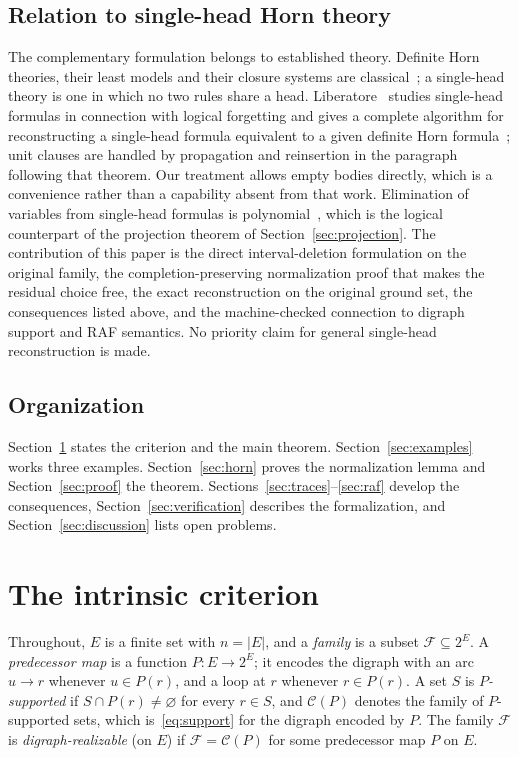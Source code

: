 \documentclass[11pt,a4paper]{article}
\theoremstyle{plain}
\theoremstyle{definition}
\theoremstyle{remark}
\newcommand{\cC}{\mathcal C}
\newcommand{\cF}{\mathcal F}
\newcommand{\pw}[1]{2^{#1}}
\begin{document}
\subsection{Relation to single-head Horn theory}

The complementary formulation belongs to established theory. Definite Horn theories, their least models and their closure systems are classical~\cite{dowling1984linear,wild2017joy}; a single-head theory is one in which no two rules share a head. Liberatore~\cite{liberatore2023reconstructing} studies single-head formulas in connection with logical forgetting and gives a complete algorithm for reconstructing a single-head formula equivalent to a given definite Horn formula~\cite[Theorem~4.1]{liberatore2023reconstructing}; unit clauses are handled by propagation and reinsertion in the paragraph following that theorem. Our treatment allows empty bodies directly, which is a convenience rather than a capability absent from that work. Elimination of variables from single-head formulas is polynomial~\cite[Section~5.7]{liberatore2020common}, which is the logical counterpart of the projection theorem of Section~\ref{sec:projection}. The contribution of this paper is the direct interval-deletion formulation on the original family, the completion-preserving normalization proof that makes the residual choice free, the exact reconstruction on the original ground set, the consequences listed above, and the machine-checked connection to digraph support and RAF semantics. No priority claim for general single-head reconstruction is made.

\subsection{Organization}

Section~\ref{sec:criterion} states the criterion and the main theorem. Section~\ref{sec:examples} works three examples. Section~\ref{sec:horn} proves the normalization lemma and Section~\ref{sec:proof} the theorem. Sections~\ref{sec:traces}--\ref{sec:raf} develop the consequences, Section~\ref{sec:verification} describes the formalization, and Section~\ref{sec:discussion} lists open problems.

\section{The intrinsic criterion}\label{sec:criterion}

Throughout, $E$ is a finite set with $n=|E|$, and a \emph{family} is a subset $\cF\subseteq\pw{E}$. A \emph{predecessor map} is a function $P:E\to\pw{E}$; it encodes the digraph with an arc $u\to r$ whenever $u\in P(r)$, and a loop at $r$ whenever $r\in P(r)$. A set $S$ is \emph{$P$-supported} if $S\cap P(r)\neq\varnothing$ for every $r\in S$, and $\cC(P)$ denotes the family of $P$-supported sets, which is~\eqref{eq:support} for the digraph encoded by $P$. The family $\cF$ is \emph{digraph-realizable} (on $E$) if $\cF=\cC(P)$ for some predecessor map $P$ on $E$.
\end{document}
